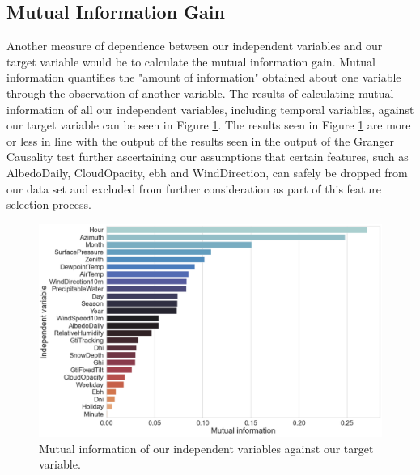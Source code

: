\subsection{Mutual Information Gain}
\label{subsec:Exploratory-Data-Analysis:Causality-and-Correlation:Mutual-Information-Gain}
Another measure of dependence between our independent variables and our target variable would be to calculate the mutual information gain. Mutual information quantifies the "amount of information" obtained about one variable through the observation of another variable. The results of calculating mutual information of all our independent variables, including temporal variables, against our target variable can be seen in Figure \ref{fig:REFIT-House-12-Mutual-Information-Gain}. The results seen in Figure \ref{fig:REFIT-House-12-Mutual-Information-Gain} are more or less in line with the output of the results seen in the output of the Granger Causality test further ascertaining our assumptions that certain features, such as AlbedoDaily, CloudOpacity, \gls{ebh} and WindDirection, can safely be dropped from our data set and excluded from further consideration as part of this feature selection process.

\begin{figure}[H]
    \centering
    \includegraphics[width=\textwidth]{Images/Chapter 4/REFIT/REFIT-House-12-Mutual-Information.pdf}
    \caption{Mutual information of our independent variables against our target variable.}
    \label{fig:REFIT-House-12-Mutual-Information-Gain}
\end{figure}